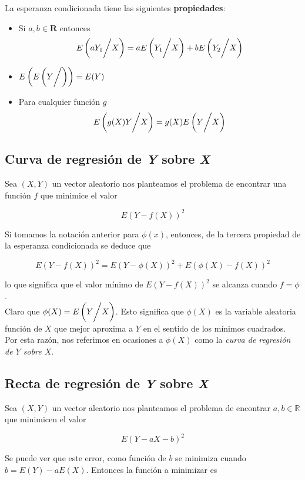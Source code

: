 La esperanza condicionada tiene las siguientes \textbf{propiedades}:
\begin{itemize}
    \item Si $a,b \in \mathbf{R}$ entonces
          \[ E\left( aY_1 \bigg{/} X \right) = aE\left( Y_1 \bigg{/} X \right) + bE\left( Y_2 \bigg{/} X \right) \]
    \item $E\left( E\left( Y \bigg{/} \right) \right) = E(Y)$
    \item Para cualquier función $g$
          \[ E\left( g(X)Y \bigg{/} X \right) = g(X)E\left( Y \bigg{/} X \right) \]
\end{itemize}

\newpage

\subsection{Curva de regresión de \textit{Y} sobre \textit{X}}

Sea $(X,Y)$ un vector aleatorio nos planteamos el problema de encontrar una función $f$ que minimice el valor

\[ E(Y - f(X))^2 \]

Si tomamos la notación anterior para $\phi(x)$, entonces, de la tercera propiedad de la esperanza condicionada se deduce que

\[ E(Y -f(X))^2 = E(Y - \phi(X))^2 + E(\phi(X) - f(X))^2 \]

lo que significa que el valor mínimo de $E(Y - f(X))^2$ se alcanza cuando $f = \phi$. \\
Claro que $\phi(X) = E\left( Y \bigg{/} X \right)$. Esto significa que $\phi(X)$ es la variable aleatoria función de $X$ que
mejor aproxima a $Y$ en el sentido de los mínimos cuadrados. Por esta razón, nos referimos en ocasiones a $\phi(X)$ como la
\textit{curva de regresión de $Y$ sobre $X$}. \\

\subsection{Recta de regresión de \textit{Y} sobre \textit{X}}

Sea $(X,Y)$ un vector aleatorio nos planteamos el problema de encontrar $a,b \in \mathbb{R}$ que minimicen el valor

\[ E(Y - aX - b)^2 \]

Se puede ver que este error, como función de $b$ se minimiza cuando $b = E(Y) - aE(X)$. Entonces la función a minimizar es

